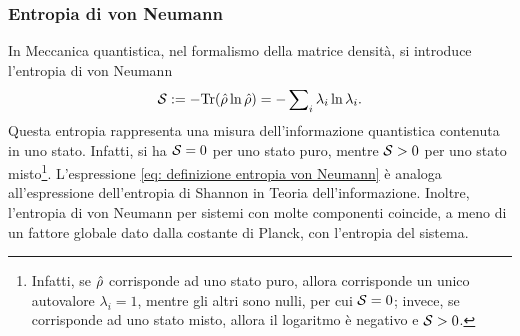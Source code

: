 \subsubsection{Entropia di von Neumann}
In Meccanica quantistica, nel formalismo della matrice densità, si introduce l'entropia di von Neumann
\begin{equation}
\label{eq: definizione entropia von Neumann}
    \mathcal{S} := -\mathrm{Tr}(\hat{\rho}\ln{\hat{\rho}}) = -\sum\nolimits_i\lambda_i\ln{\lambda_i}.
\end{equation}
Questa entropia rappresenta una misura dell'informazione quantistica contenuta in uno stato. Infatti, si ha $\mathcal{S} = 0$ per uno stato puro, mentre $\mathcal{S} > 0$ per uno stato misto\footnote{Infatti, se $\hat{\rho}$ corrisponde ad uno stato puro, allora corrisponde un unico autovalore $\lambda_i = 1$, mentre gli altri sono nulli, per cui $\mathcal{S} = 0$; invece, se corrisponde ad uno stato misto, allora il logaritmo è negativo e $\mathcal{S} > 0$.}. L'espressione \eqref{eq: definizione entropia von Neumann} è analoga all'espressione dell'entropia di Shannon in Teoria dell'informazione. Inoltre, l'entropia di von Neumann per sistemi con molte componenti coincide, a meno di un fattore globale dato dalla costante di Planck, con l'entropia del sistema. 